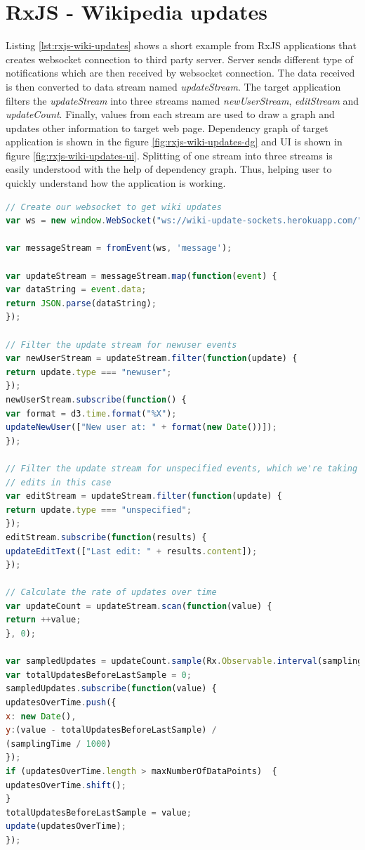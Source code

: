\section{RxJS - Wikipedia updates}
Listing \ref{lst:rxjs-wiki-updates} shows a short example from RxJS applications that creates websocket connection to third party server. Server sends different type of notifications which are then received by websocket connection. The data received is then converted to data stream named \textit{updateStream}. The target application filters the \textit{updateStream} into three streams named \textit{newUserStream}, \textit{editStream} and \textit{updateCount}. Finally, values from each stream are used to draw a graph and updates other information to target web page. Dependency graph of target application is shown in the figure \ref{fig:rxjs-wiki-updates-dg} and UI is shown in figure \ref{fig:rxjs-wiki-updates-ui}. Splitting of one stream into three streams is easily understood with the help of dependency graph. Thus, helping user to quickly understand how the application is working. 

\begin{lstlisting}[language=JavaScript, caption=RxJS - Live updates from Wikipedia, label={lst:rxjs-wiki-updates}]
// Create our websocket to get wiki updates
var ws = new window.WebSocket("ws://wiki-update-sockets.herokuapp.com/");

var messageStream = fromEvent(ws, 'message');

var updateStream = messageStream.map(function(event) {
var dataString = event.data;
return JSON.parse(dataString);
});

// Filter the update stream for newuser events
var newUserStream = updateStream.filter(function(update) {
return update.type === "newuser";
});
newUserStream.subscribe(function() {
var format = d3.time.format("%X");
updateNewUser(["New user at: " + format(new Date())]);
});

// Filter the update stream for unspecified events, which we're taking to mean
// edits in this case
var editStream = updateStream.filter(function(update) {
return update.type === "unspecified";
});
editStream.subscribe(function(results) {
updateEditText(["Last edit: " + results.content]);
});

// Calculate the rate of updates over time
var updateCount = updateStream.scan(function(value) {
return ++value;
}, 0);

var sampledUpdates = updateCount.sample(Rx.Observable.interval(samplingTime));
var totalUpdatesBeforeLastSample = 0;
sampledUpdates.subscribe(function(value) {
updatesOverTime.push({
x: new Date(),
y:(value - totalUpdatesBeforeLastSample) /
(samplingTime / 1000)
});
if (updatesOverTime.length > maxNumberOfDataPoints)  {
updatesOverTime.shift();
}
totalUpdatesBeforeLastSample = value;
update(updatesOverTime);
});
\end{lstlisting}

